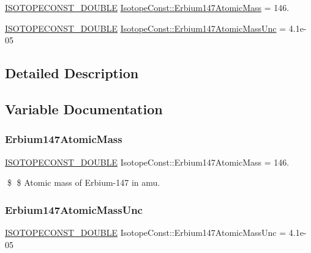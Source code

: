 \begin{DoxyCompactItemize}
\item 
\mbox{\hyperlink{group___isotope_const-_macros_ga8f45a7272ce02c0b4c65c44636ed719a}{I\+S\+O\+T\+O\+P\+E\+C\+O\+N\+S\+T\+\_\+\+D\+O\+U\+B\+LE}} \mbox{\hyperlink{group___isotope_const-_erbium-_er147_ga36161dd8069201827e09bd9e5c9ca8da}{Isotope\+Const\+::\+Erbium147\+Atomic\+Mass}} = 146.
\item 
\mbox{\hyperlink{group___isotope_const-_macros_ga8f45a7272ce02c0b4c65c44636ed719a}{I\+S\+O\+T\+O\+P\+E\+C\+O\+N\+S\+T\+\_\+\+D\+O\+U\+B\+LE}} \mbox{\hyperlink{group___isotope_const-_erbium-_er147_ga48cebcec6c29b363bd743ea3c53fc58d}{Isotope\+Const\+::\+Erbium147\+Atomic\+Mass\+Unc}} = 4.\+1e-\/05
\end{DoxyCompactItemize}


\subsection{Detailed Description}


\subsection{Variable Documentation}
\mbox{\label{group___isotope_const-_erbium-_er147_ga36161dd8069201827e09bd9e5c9ca8da}} 
\subsubsection{\texorpdfstring{Erbium147\+Atomic\+Mass}{Erbium147AtomicMass}}
{\footnotesize\ttfamily \mbox{\hyperlink{group___isotope_const-_macros_ga8f45a7272ce02c0b4c65c44636ed719a}{I\+S\+O\+T\+O\+P\+E\+C\+O\+N\+S\+T\+\_\+\+D\+O\+U\+B\+LE}} Isotope\+Const\+::\+Erbium147\+Atomic\+Mass = 146.}

\$ \$ Atomic mass of Erbium-\/147 in amu. \mbox{\label{group___isotope_const-_erbium-_er147_ga48cebcec6c29b363bd743ea3c53fc58d}} 
\subsubsection{\texorpdfstring{Erbium147\+Atomic\+Mass\+Unc}{Erbium147AtomicMassUnc}}
{\footnotesize\ttfamily \mbox{\hyperlink{group___isotope_const-_macros_ga8f45a7272ce02c0b4c65c44636ed719a}{I\+S\+O\+T\+O\+P\+E\+C\+O\+N\+S\+T\+\_\+\+D\+O\+U\+B\+LE}} Isotope\+Const\+::\+Erbium147\+Atomic\+Mass\+Unc = 4.\+1e-\/05}

